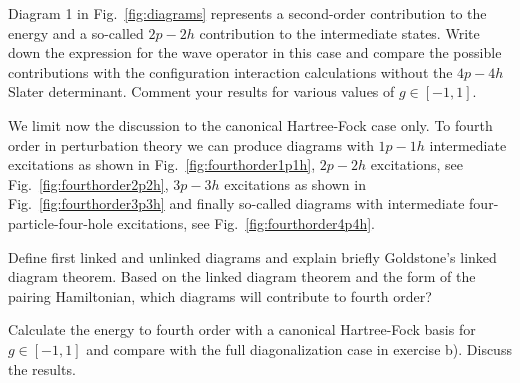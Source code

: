\begin{prob}
\begin{enumerate}
Diagram 1 in Fig.~\ref{fig:diagrams} represents a second-order contribution to the energy and a so-called $2p-2h$ contribution to the intermediate states. Write down the expression for the wave operator in this case and compare the possible contributions with the configuration interaction calculations without the $4p-4h$ Slater determinant. Comment your results for
various values of $g\in [-1,1]$.

We limit now the discussion to the canonical Hartree-Fock case only. To fourth order in perturbation theory we can produce diagrams with $1p-1h$ intermediate excitations as shown in Fig.~\ref{fig:fourthorder1p1h}, $2p-2h$ excitations, see Fig.~\ref{fig:fourthorder2p2h}, $3p-3h$ excitations as shown in Fig.~\ref{fig:fourthorder3p3h} and finally so-called diagrams with intermediate four-particle-four-hole excitations, see Fig.~\ref{fig:fourthorder4p4h}.

Define first linked and unlinked diagrams and explain briefly Goldstone's linked diagram theorem.
Based on the linked diagram theorem and the form of the pairing Hamiltonian, which diagrams will contribute
to fourth order?

Calculate the energy to fourth order with a canonical Hartree-Fock basis for $g\in [-1,1]$ and compare
with the full diagonalization case in exercise b). Discuss the results.
\end{enumerate}



\end{prob}


